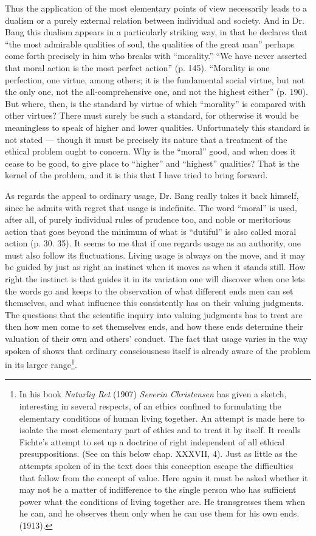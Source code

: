 \documentclass[12pt,a4paper,openany]{book}
\newcommand{\opage}[1]{\marginnote{\footnotesize\textit{[#1]}}}
\begin{document}
Thus the application of the most elementary points of view necessarily leads to a dualism or a purely
external relation between individual and society. And in Dr. Bang this dualism appears in a
particularly striking way, in that he declares that ``the most admirable qualities of soul, the
qualities of the great man'' perhaps come forth precisely in him who breaks with ``morality.'' ``We have
never asserted that moral action is the most perfect action'' (p. 145). ``Morality is one perfection,
one virtue, among others; it is the fundamental social virtue, but not the only one, not the
all-comprehensive one, and not the highest either'' (p. 190). But where, then, is the standard by
virtue of which ``morality'' is compared with other virtues? There must surely be such a standard, for
otherwise it would be meaningless to speak of higher and lower qualities. Unfortunately this standard
is not stated --- though it must be precisely its nature that a treatment of the ethical problem ought
to concern. Why is the ``moral'' good, and when does it cease to be good, to give place to ``higher''
and ``highest'' qualities? That is the kernel of the problem, and it is this that I have tried to bring
forward.

\opage{72}As regards the appeal to ordinary usage, Dr. Bang really takes it back himself, since he admits with
regret that usage is indefinite. The word ``moral'' is used, after all, of purely individual rules of
prudence too, and noble or meritorious action that goes beyond the minimum of what is ``dutiful'' is
also called moral action (p. 30. 35). It seems to me that if one regards usage as an authority, one
must also follow its fluctuations. Living usage is always on the move, and it may be guided by just as
right an instinct when it moves as when it stands still. How right the instinct is that guides it in its
variation one will discover when one lets the words go and keeps to the observation of what different
ends men can set themselves, and what influence this consistently has on their valuing judgments. The
questions that the scientific inquiry into valuing judgments has to treat are then how men come to set
themselves ends, and how these ends determine their valuation of their own and others' conduct. The
fact that usage varies in the way spoken of shows that ordinary consciousness itself is already aware of
the problem in its larger range\footnote[1]{In his book \textit{Naturlig Ret} (1907) \textit{Severin
Christensen} has given a sketch, interesting in several respects, of an ethics confined to formulating
the elementary conditions of human living together. An attempt is made here to isolate the most
elementary part of ethics and to treat it by itself. It recalls Fichte's attempt to set up a doctrine of
right independent of all ethical presuppositions. (See on this below chap. XXXVII, 4). Just as little
as the attempts spoken of in the text does this conception escape the difficulties that follow from the
concept of value. Here again it must be asked whether it may not be a matter of indifference to the
single person who has sufficient power what the conditions of living together are. He transgresses them
when he can, and he observes them only when he can use them for his own ends. (1913).}.
\end{document}
